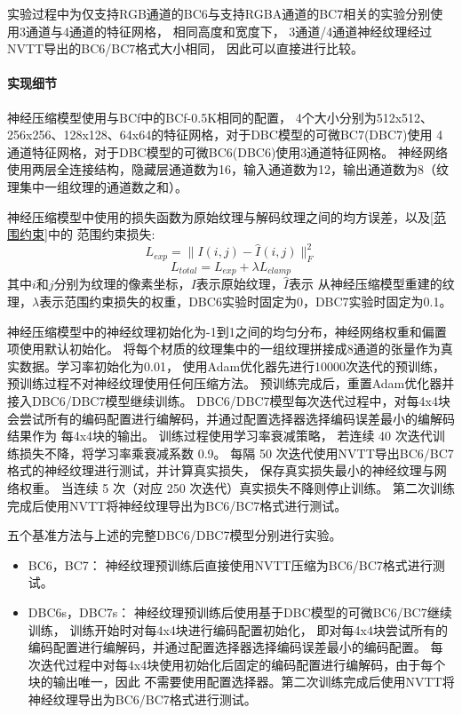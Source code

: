 实验过程中为仅支持RGB通道的BC6与支持RGBA通道的BC7相关的实验分别使用3通道与4通道的特征网格，
相同高度和宽度下，
3通道/4通道神经纹理经过NVTT导出的BC6/BC7格式大小相同，
因此可以直接进行比较。

\paragraph{实现细节}

神经压缩模型使用与BCf\cite{weinreich2024real}中的BCf-0.5K相同的配置，
4个大小分别为512x512、256x256、128x128、64x64的特征网格，对于DBC模型的可微BC7(DBC7)使用
4通道特征网格，对于DBC模型的可微BC6(DBC6)使用3通道特征网格。
神经网络使用两层全连接结构，隐藏层通道数为16，输入通道数为12，输出通道数为8（纹理集中一组纹理的通道数之和）。

神经压缩模型中使用的损失函数为原始纹理与解码纹理之间的均方误差，以及\ref{范围约束}中的
范围约束损失:
\begin{equation}
    L_{exp}=\| I(i,j) - \hat{I}(i,j) \|^2_F
\end{equation}
\begin{equation}
    L_{total}=L_{exp}+\lambda L_{clamp}
\end{equation}
其中$i$和$j$分别为纹理的像素坐标，$I$表示原始纹理，$\hat{I}$表示
从神经压缩模型重建的纹理，$\lambda$表示范围约束损失的权重，DBC6实验时固定为0，DBC7实验时固定为0.1。

神经压缩模型中的神经纹理初始化为-1到1之间的均匀分布，神经网络权重和偏置项使用默认初始化。
将每个材质的纹理集中的一组纹理拼接成8通道的张量作为真实数据。学习率初始化为0.01，
使用Adam优化器先进行10000次迭代的预训练，预训练过程不对神经纹理使用任何压缩方法。
预训练完成后，重置Adam优化器并接入DBC6/DBC7模型继续训练。
DBC6/DBC7模型每次迭代过程中，对每4x4块会尝试所有的编码配置进行编解码，并通过配置选择器选择编码误差最小的编解码结果作为
每4x4块的输出。
训练过程使用学习率衰减策略，
若连续 40 次迭代训练损失不降，将学习率乘衰减系数 0.9。
每隔 50 次迭代使用NVTT导出BC6/BC7格式的神经纹理进行测试，并计算真实损失，
保存真实损失最小的神经纹理与网络权重。
当连续 5 次（对应 250 次迭代）真实损失不降则停止训练。
第二次训练完成后使用NVTT将神经纹理导出为BC6/BC7格式进行测试。

五个基准方法与上述的完整DBC6/DBC7模型分别进行实验。

\begin{itemize}
    \item BC6，BC7： 神经纹理预训练后直接使用NVTT压缩为BC6/BC7格式进行测试。
    \item DBC6s，DBC7s： 神经纹理预训练后使用基于DBC模型的可微BC6/BC7继续训练，
    训练开始时对每4x4块进行编码配置初始化，
    即对每4x4块尝试所有的编码配置进行编解码，并通过配置选择器选择编码误差最小的编码配置。
    每次迭代过程中对每4x4块使用初始化后固定的编码配置进行编解码，由于每个块的输出唯一，因此
    不需要使用配置选择器。第二次训练完成后使用NVTT将神经纹理导出为BC6/BC7格式进行测试。
\end{itemize}

